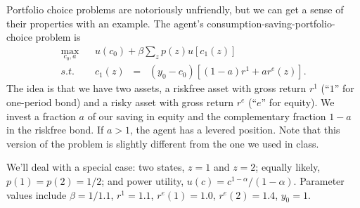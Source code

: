 \documentclass[11pt]{exam}
\begin{document}
\begin{questions}
\begin{solution}
\end{solution}




Portfolio choice problems are notoriously unfriendly,
but we can get a sense of their properties with an example.
The agent's consumption-saving-portfolio-choice problem is
\begin{eqnarray*}
   \max_{c_0, a} &&  u(c_0) + \beta \sum_z p(z) u[c_1(z)] \\
        s.t. &&  c_1(z)\;\;=\;\; (y_0-c_0)[(1-a) r^1 + a r^e(z)] .
\end{eqnarray*}
The idea is that we have two assets,
a riskfree asset with gross return $r^1$ (``$1$'' for one-period bond)
and a risky asset with gross return $r^e$  (``$e$'' for equity).
We invest a fraction $a$ of our saving in equity and the complementary
fraction $1-a$ in the riskfree bond.
If $a>1$, the agent has a levered position.
Note that this version of the problem is slightly different from the one we used in class.

We'll deal with a special case:
two states, $z=1$ and $z=2$;
equally likely, $p(1) = p(2) = 1/2$;
and power utility, $u(c) = c^{1-\alpha}/(1-\alpha)$.
Parameter values include
$\beta = 1/1.1$,
$r^1 = 1.1$,
$r^e(1) = 1.0$, $r^e(2) = 1.4$,
$ y_0 = 1$.

\end{questions}
\end{document}
